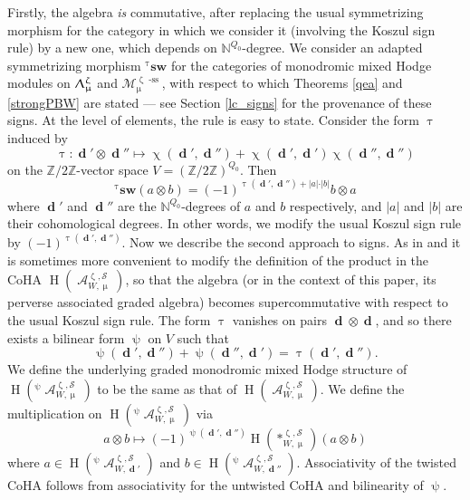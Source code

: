 \documentclass[a4paper,10pt]{amsart}
\renewcommand{\zeta}{\upzeta}
\renewcommand{\chi}{\upchi}
\renewcommand{\Lambda}{\Uplambda}
\renewcommand{\psi}{\uppsi}
\renewcommand{\tau}{\uptau}
\renewcommand{\mu}{\upmu}
\newcommand{\SP}{\mathcal{S}}
\newcommand{\Msp}{\mathcal{M}}
\DeclareMathOperator{\sst}{-ss}
\DeclareMathOperator{\dd}{\mathbf{d}}
\DeclareMathOperator{\HO}{H}
\DeclareMathOperator{\Coha}{\mathcal{A}}
\begin{document}
Firstly, the algebra \textit{is} commutative, after replacing the usual symmetrizing morphism for the category in which we consider it (involving the Koszul sign rule) by a new one, which depends on $\mathbb{N}^{Q_0}$-degree.  We consider an adapted symmetrizing morphism ${}^{\tau}\textbf{sw}$ for the categories of monodromic mixed Hodge modules on $\Lambda_{\mu}^{\zeta}$ and $\Msp^{\zeta\sst}_{\mu}$, with respect to which Theorems \ref{qea} and \ref{strongPBW} are stated --- see Section \ref{lc_signs} for the provenance of these signs.  At the level of elements, the rule is easy to state.  Consider the form $\tau$ induced by 
\begin{equation}
\label{half_tau}
\tau\colon \dd'\otimes \dd''\mapsto \chi(\dd',\dd'')+\chi(\dd',\dd')\chi(\dd'',\dd'')
\end{equation}
on the $\mathbb{Z}/2\mathbb{Z}$-vector space $V=(\mathbb{Z}/2\mathbb{Z})^{Q_0}$.  Then
\[
{}^{\tau}\textbf{sw}(a\otimes b)=(-1)^{\tau(\dd',\dd'')+\lvert a\lvert \cdot\lvert b\lvert}b\otimes a
\]
where $\dd'$ and $\dd''$ are the $\mathbb{N}^{Q_0}$-degrees of $a$ and $b$ respectively, and $\lvert a\lvert$ and $\lvert b\lvert$ are their cohomological degrees.  In other words, we modify the usual Koszul sign rule by $(-1)^{\tau(\dd',\dd'')}$.
\smallbreak
Now we describe the second approach to signs.  As in \cite[Sec.2.6]{KS2} and \cite{Efimov} it is sometimes more convenient to modify the definition of the product in the CoHA $\HO(\Coha_{W,\mu}^{\zeta,\SP})$, so that the algebra (or in the context of this paper, its perverse associated graded algebra) becomes supercommutative with respect to the usual Koszul sign rule.  The form $\tau$ vanishes on pairs $\dd\otimes \dd$, and so there exists a bilinear form $\psi$ on $V$ such that
\begin{equation}
\label{pcocdef}
\psi(\dd',\dd'')+\psi(\dd'',\dd')=\tau(\dd',\dd'').
\end{equation}
We define the underlying graded monodromic mixed Hodge structure of $\HO(^\psi\!\!\Coha_{W,\mu}^{\zeta,\SP})$ to be the same as that of $\HO(\Coha_{W,\mu}^{\zeta,\SP})$.  We define the multiplication on $\HO(^{\psi}\!\!\Coha_{W,\mu}^{\zeta,\SP})$ via 
\begin{equation}
\label{psitwdef}
a\otimes b\mapsto (-1)^{\psi(\dd',\dd'')}\HO(\ast_{W,\mu}^{\zeta,\SP})(a\otimes b)
\end{equation}
where $a\in \HO(^{\psi}\!\!\Coha_{W,\dd'}^{\zeta,\SP})$ and $b\in \HO(^{\psi}\!\!\Coha_{W,\dd''}^{\zeta,\SP})$.  Associativity of the twisted CoHA follows from associativity for the untwisted CoHA and bilinearity of $\psi$.
\end{document}

